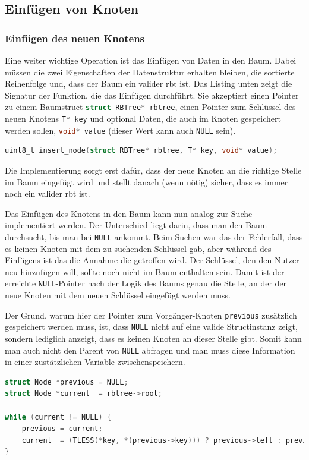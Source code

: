 \documentclass[11pt]{article}
\newcommand{\lstin}[1]{\lstinline[language=C]{#1}}
\begin{document}
\subsection{Einfügen von Knoten}

\subsubsection{Einfügen des neuen Knotens}
Eine weiter wichtige Operation ist das Einfügen von Daten in den Baum. Dabei müssen die zwei Eigenschaften der Datenstruktur erhalten bleiben, die sortierte Reihenfolge und, dass der Baum ein valider \gls{rbt} ist.
Das Listing unten zeigt die Signatur der Funktion, die das Einfügen durchführt. Sie akzeptiert einen Pointer zu einem Baumstruct \lstin{struct RBTree* rbtree}, einen Pointer zum Schlüssel des neuen Knotens \lstin{T* key} und optional Daten, die auch im Knoten gespeichert werden sollen, \lstin{void* value} (dieser Wert kann auch \lstin{NULL} sein).

\begin{lstlisting}[language=C]
uint8_t insert_node(struct RBTree* rbtree, T* key, void* value);
\end{lstlisting}

Die Implementierung sorgt erst dafür, dass der neue Knoten an die richtige Stelle im Baum eingefügt wird und stellt danach (wenn nötig) sicher, dass es immer noch ein valider \gls{rbt} ist.

Das Einfügen des Knotens in den Baum kann nun analog zur Suche implementiert werden.
Der Unterschied liegt darin, dass man den Baum durchsucht, bis man bei \lstin{NULL} ankommt.
Beim Suchen war das der Fehlerfall, dass es keinen Knoten mit dem zu suchenden Schlüssel gab, aber während des Einfügens ist das die Annahme die getroffen wird.
Der Schlüssel, den den Nutzer neu hinzufügen will, sollte noch nicht im Baum enthalten sein. Damit ist der erreichte \lstin{NULL}-Pointer nach der Logik des Baums genau die Stelle, an der der neue Knoten mit dem neuen Schlüssel eingefügt werden muss.

Der Grund, warum hier der Pointer zum Vorgänger-Knoten \lstin{previous} zusätzlich gespeichert werden muss, ist,
dass \lstin{NULL} nicht auf eine valide Structinstanz zeigt, sondern lediglich anzeigt, dass es keinen Knoten an dieser Stelle gibt.
Somit kann man auch nicht den Parent von \lstin{NULL} abfragen und man muss diese Information in einer zustätzlichen Variable zwischenspeichern.

\begin{lstlisting}[language=C]
struct Node *previous = NULL;
struct Node *current  = rbtree->root;

while (current != NULL) {
    previous = current;
    current  = (TLESS(*key, *(previous->key))) ? previous->left : previous->right;
}
\end{lstlisting}
\end{document}
